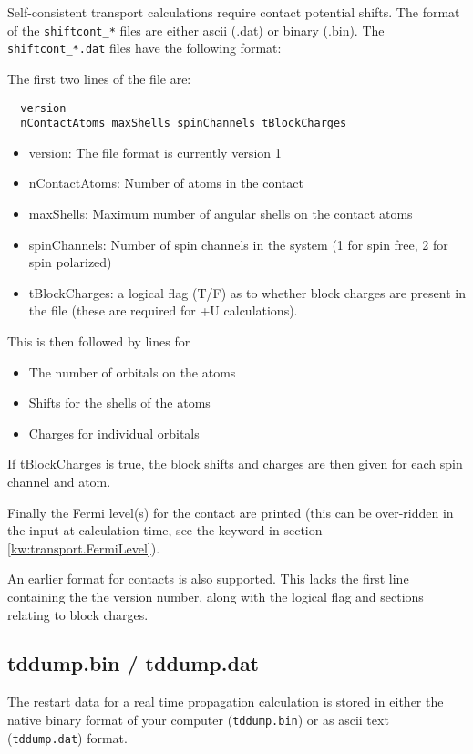 Self-consistent transport calculations require contact potential shifts. The
format of the \verb|shiftcont_*| files are either ascii (.dat) or binary
(.bin). The \verb|shiftcont_*.dat| files have the following format:

The first two lines of the file are:
\begin{verbatim}
  version
  nContactAtoms maxShells spinChannels tBlockCharges
\end{verbatim}

\begin{itemize}
\item version: The file format is currently version 1
\item nContactAtoms: Number of atoms in the contact
\item maxShells: Maximum number of angular shells on the contact atoms
\item spinChannels: Number of spin channels in the system (1 for spin free, 2
  for spin polarized)
\item tBlockCharges: a logical flag (T/F) as to whether block charges are
  present in the file (these are required for +U calculations).
\end{itemize}
This is then followed by lines for
\begin{itemize}
\item The number of orbitals on the atoms
\item Shifts for the shells of the atoms
\item Charges for individual orbitals
\end{itemize}

If tBlockCharges is true, the block shifts and charges are then given for each
spin channel and atom.

Finally the Fermi level(s) for the contact are printed (this can be over-ridden
in the input at calculation time, see the  keyword in section
\ref{kw:transport.FermiLevel}).

An earlier format for contacts is also supported. This lacks the first line
containing the the version number, along with the logical flag and sections
relating to block charges.


\subsection{tddump.bin / tddump.dat}
\label{app:tddump}

The restart data for a real time propagation calculation is stored in either the
native binary format of your computer (\verb|tddump.bin|) or as ascii text
(\verb|tddump.dat|) format.

